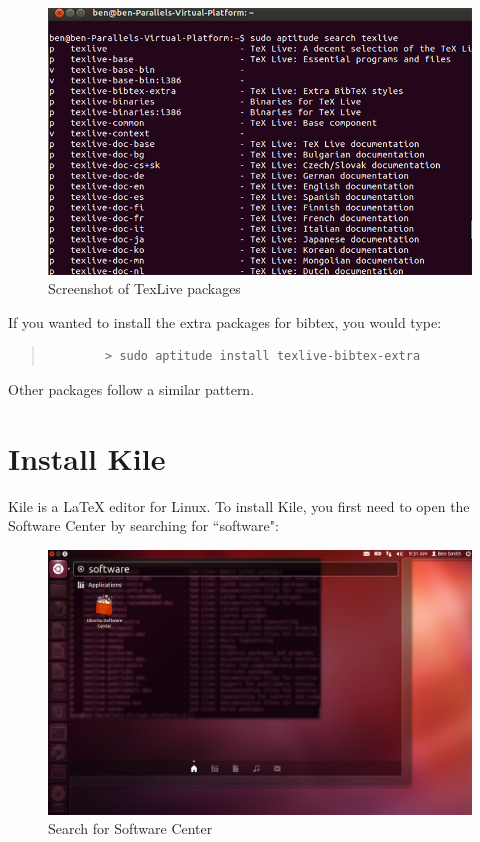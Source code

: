 \documentclass[11pt]{article}
\begin{document}
\begin{figure}[!h]
	\centering
	\includegraphics[width=5in]{graphics/ShowTexLivePackages.png}
	\caption{Screenshot of TexLive packages}
	\label{fig:texlive}
\end{figure}

If you wanted to install the extra packages for bibtex, you would type:

\begin{quote}
	\begin{verbatim}
		> sudo aptitude install texlive-bibtex-extra
	\end{verbatim}
\end{quote}

Other packages follow a similar pattern.

\section{Install Kile}

Kile is a LaTeX editor for Linux.  To install Kile, you first need to open the Software Center by searching for ``software":

\begin{figure}[!h]
	\centering
	\includegraphics[width=5in]{graphics/OpenSoftwareCenter.png}
	\caption{Search for Software Center}
\end{figure}
\end{document}
